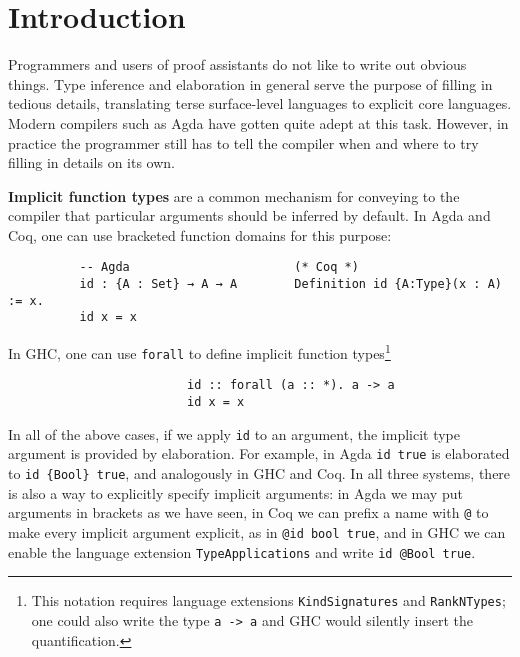 \documentclass[acmsmall,review,anonymous]{acmart}\settopmatter{printfolios=true,printccs=false,printacmref=false}
\begin{document}

\maketitle


\section{Introduction}

Programmers and users of proof assistants do not like to write out obvious
things. Type inference and elaboration in general serve the purpose of filling
in tedious details, translating terse surface-level languages to explicit core
languages. Modern compilers such as Agda have gotten quite adept at this
task. However, in practice the programmer still has to tell the compiler when
and where to try filling in details on its own.

\textbf{Implicit function types} are a common mechanism for conveying to the
compiler that particular arguments should be inferred by default. In Agda and
Coq, one can use bracketed function domains for this purpose:
\begin{verbatim}
          -- Agda                       (* Coq *)
          id : {A : Set} → A → A        Definition id {A:Type}(x : A) := x.
          id x = x
\end{verbatim}
In GHC, one can use \texttt{forall} to define implicit function
types\footnote{This notation requires language extensions
  \texttt{KindSignatures} and \texttt{RankNTypes}; one could also write the type
  \texttt{a -> a} and GHC would silently insert the quantification.}
\begin{verbatim}
                         id :: forall (a :: *). a -> a
                         id x = x
\end{verbatim}

In all of the above cases, if we apply \texttt{id} to an argument, the implicit
type argument is provided by elaboration. For example, in Agda \texttt{id true}
is elaborated to \texttt{id \{Bool\} true}, and analogously in GHC and Coq. In
all three systems, there is also a way to explicitly specify implicit arguments:
in Agda we may put arguments in brackets as we have seen, in Coq we can prefix a
name with \texttt{@} to make every implicit argument explicit, as in \texttt{@id
  bool true}, and in GHC we can enable the language extension
\texttt{TypeApplications} and write \texttt{id @Bool true}.
\end{document}
